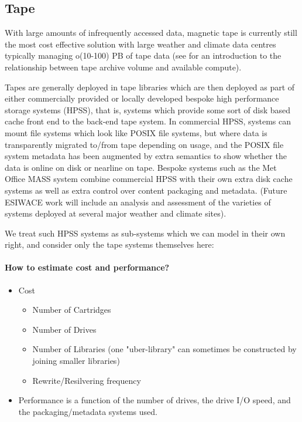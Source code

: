 \documentclass{../../template/esiwace-report}
\begin{document}
\subsection{Tape}

With large amounts of infrequently accessed data, magnetic tape is currently still the most cost effective solution with large weather and climate data centres typically managing o(10-100) PB of tape data (see  for an introduction to the relationship between tape archive volume and available compute).

Tapes are generally deployed in tape libraries which are then deployed as part of either commercially provided or locally developed bespoke high performance storage systems (HPSS), that is, systems which provide some sort of disk based cache front end to the back-end tape system. In commercial HPSS, systems can mount file systems which look like POSIX file systems, but where data is transparently migrated to/from tape depending on usage, and the POSIX file system metadata has been augmented by extra semantics to show whether the data is online on disk or nearline on tape. Bespoke systems such as the Met Office MASS system combine commercial HPSS with their own extra disk cache systems as well as extra control over content packaging and metadata. (Future ESIWACE work will include an analysis and assessment of the varieties of systems deployed at several major weather and climate sites).

We treat such HPSS systems as sub-systems which we can model in their own right, and consider only the tape systems themselves here:


\paragraph{How to estimate cost and performance?}

\begin{itemize}
\item Cost
\begin{itemize}
\item Number of Cartridges
\item Number of Drives
\item Number of Libraries (one "uber-library" can sometimes be constructed by joining smaller libraries)
\item Rewrite/Resilvering frequency
\end{itemize}
\item Performance is a function of the number of drives, the drive I/O speed, and the packaging/metadata systems used.
\end{itemize}
\end{document}

